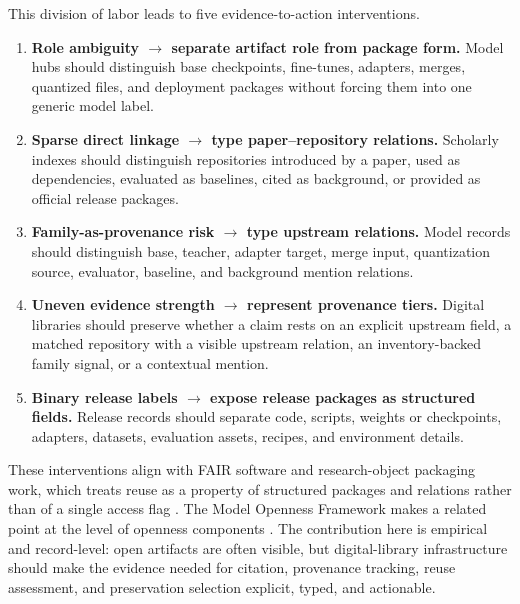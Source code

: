 This division of labor leads to five evidence-to-action interventions.
\begin{enumerate}[leftmargin=*,itemsep=2pt,topsep=2pt]
    \item \textbf{Role ambiguity $\rightarrow$ separate artifact role from package form.} Model hubs should distinguish base checkpoints, fine-tunes, adapters, merges, quantized files, and deployment packages without forcing them into one generic model label.
    \item \textbf{Sparse direct linkage $\rightarrow$ type paper--repository relations.} Scholarly indexes should distinguish repositories introduced by a paper, used as dependencies, evaluated as baselines, cited as background, or provided as official release packages.
    \item \textbf{Family-as-provenance risk $\rightarrow$ type upstream relations.} Model records should distinguish base, teacher, adapter target, merge input, quantization source, evaluator, baseline, and background mention relations.
    \item \textbf{Uneven evidence strength $\rightarrow$ represent provenance tiers.} Digital libraries should preserve whether a claim rests on an explicit upstream field, a matched repository with a visible upstream relation, an inventory-backed family signal, or a contextual mention.
    \item \textbf{Binary release labels $\rightarrow$ expose release packages as structured fields.} Release records should separate code, scripts, weights or checkpoints, adapters, datasets, evaluation assets, recipes, and environment details.
\end{enumerate}

These interventions align with FAIR software and research-object packaging work, which treats reuse as a property of structured packages and relations rather than of a single access flag \cite{barker2022fair4rs,soilandreyes2022rocrate}. The Model Openness Framework makes a related point at the level of openness components \cite{white2024mof}. The contribution here is empirical and record-level: open \llm artifacts are often visible, but digital-library infrastructure should make the evidence needed for citation, provenance tracking, reuse assessment, and preservation selection explicit, typed, and actionable.

